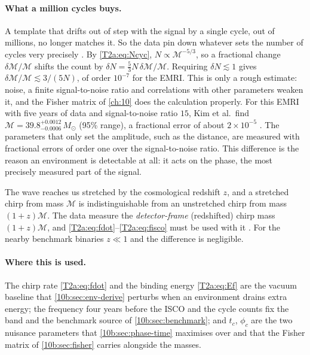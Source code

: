 \paragraph{What a million cycles buys.}
A template that drifts out of step with the signal by a single cycle, out of millions, no longer matches it. So the data pin down whatever sets the number of cycles very precisely \cite[Sec.~I]{CutlerFlanagan1994}. By \eqref{T2a:eq:Ncyc}, $N\propto\mathcal M^{-5/3}$, so a fractional change $\delta\mathcal M/\mathcal M$ shifts the count by $\delta N=\frac53N\,\delta\mathcal M/\mathcal M$. Requiring $\delta N\lesssim1$ gives $\delta\mathcal M/\mathcal M\lesssim3/(5N)$, of order $10^{-7}$ for the EMRI. This is only a rough estimate: noise, a finite signal-to-noise ratio and correlations with other parameters weaken it, and the Fisher matrix of \cref{ch:10} does the calculation properly. For this EMRI with five years of data and signal-to-noise ratio $15$, Kim et al.\ find $\mathcal M=39.8^{+0.0012}_{-0.0006}\,M_\odot$ (95\% range), a fractional error of about $2\times10^{-5}$ \cite[Fig.~4]{Kim2023}. The parameters that only set the amplitude, such as the distance, are measured with fractional errors of order one over the signal-to-noise ratio. This difference is the reason an environment is detectable at all: it acts on the phase, the most precisely measured part of the signal.

\begin{pitfall}
The wave reaches us stretched by the cosmological redshift $z$, and a stretched chirp from mass $\mathcal M$ is indistinguishable from an unstretched chirp from mass $(1+z)\mathcal M$. The data measure the \emph{detector-frame} (redshifted) chirp mass $(1+z)\mathcal M$, and \eqref{T2a:eq:fdot}--\eqref{T2a:eq:fisco} must be used with it \cite[Sec.~2]{Robson2019}. For the nearby benchmark binaries $z\ll1$ and the difference is negligible.
\end{pitfall}

\paragraph{Where this is used.}
The chirp rate \eqref{T2a:eq:fdot} and the binding energy \eqref{T2a:eq:Ef} are the vacuum baseline that \cref{10b:sec:env-derive} perturbs when an environment drains extra energy; the frequency four years before the ISCO and the cycle counts fix the band and the benchmark source of \cref{10b:sec:benchmark}; and $t_c$, $\phi_c$ are the two nuisance parameters that \cref{10b:sec:phase-time} maximises over and that the Fisher matrix of \cref{10b:sec:fisher} carries alongside the masses.

